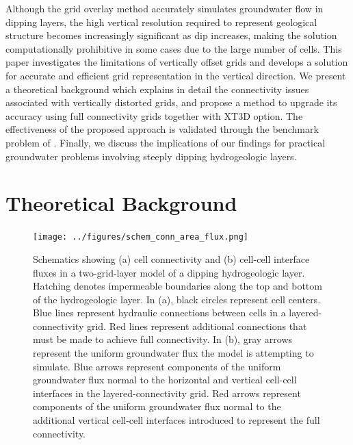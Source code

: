 \documentclass{article}
\begin{document}
Although the grid overlay method accurately simulates groundwater flow in dipping layers, the high vertical resolution required to represent geological structure becomes increasingly significant as dip increases, making the solution computationally prohibitive in some cases due to the large number of cells. This paper investigates the limitations of vertically offset grids and develops a solution for accurate and efficient grid representation in the vertical direction. We present a theoretical background which explains in detail the connectivity issues associated with vertically distorted grids, and propose a method to upgrade its accuracy using full connectivity grids together with XT3D option. The effectiveness of the proposed approach is validated through the benchmark problem of \cite{bardot2022}. Finally, we discuss the implications of our findings for practical groundwater problems involving steeply dipping hydrogeologic layers.

\section{Theoretical Background}

\begin{figure}
	\begin{center}
	\texttt{[image: ../figures/schem\_conn\_area\_flux.png]}
	\caption{Schematics showing (a) cell connectivity and (b) cell-cell interface fluxes in a two-grid-layer model of a dipping hydrogeologic layer. Hatching denotes impermeable boundaries along the top and bottom of the hydrogeologic layer. In (a), black circles represent cell centers. Blue lines represent hydraulic connections between cells in a layered-connectivity grid. Red lines represent additional connections that must be made to achieve full connectivity. In (b), gray arrows represent the uniform groundwater flux the model is attempting to simulate. Blue arrows represent components of the uniform groundwater flux normal to the horizontal and vertical cell-cell interfaces in the layered-connectivity grid. Red arrows represent components of the uniform groundwater flux normal to the additional vertical cell-cell interfaces introduced to represent the full connectivity.}
	\label{fig:schem-conn-area-flux}
	\end{center}
\end{figure}
\end{document}

